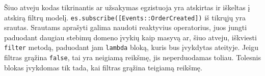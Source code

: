 Šiuo atveju kodas tikrinantis ar užsakymas egzistuoja yra atskirtas ir iškeltas į atskirą filtrų modelį. \lstinline|es.subscribe([Events::OrderCreated])| iš tikrųjų yra srautas. Srautams aprašyti galima naudoti reaktyvius operatorius, juos jungti paduodant daugiau stebimų domeno įvykių kaip masyvą ar, šiuo atveju, iškviesti \lstinline|filter| metodą, paduodant jam \lstinline|lambda| bloką, kuris bus įvykdytas ateityje. Jeigu filtras grąžina \lstinline|false|, tai yra neigiamą reikšmę, jis neperduodamas toliau. Tolesnis blokas įvykdomas tik tada, kai filtras grąžina teigiamą reikšmę.









